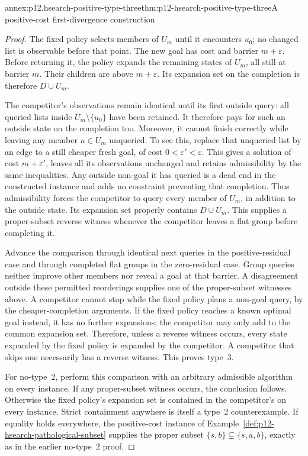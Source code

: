 \begin{annexitem}{annex:p12.hsearch-positive-type-three}{thm:p12-hsearch-positive-type-three}{A positive-cost first-divergence construction}
\begin{proof}
The fixed policy selects members of \(U_m\) until it encounters
\(u_0\); no changed list is observable before that point. The new
goal has cost and barrier \(m+\varepsilon\). Before returning it,
the policy expands the remaining states of \(U_m\), all still at
barrier \(m\). Their children are above \(m+\varepsilon\).
Its expansion set on the completion is therefore \(D\cup U_m\).

The competitor's observations remain identical until its first outside
query: all queried lists inside \(U_m\setminus\{u_0\}\) have
been retained.
It therefore pays for such an outside state on the completion too.
Moreover, it cannot finish correctly while leaving any member
\(u\in U_m\) unqueried. To see this, replace that unqueried list
by an edge to a still cheaper fresh goal, of cost
\(0<\varepsilon'<\varepsilon\). This gives a solution of cost
\(m+\varepsilon'\), leaves all its observations unchanged and
retains admissibility by the same inequalities. Any outside non-goal it
has queried is a dead end in the constructed instance and adds no
constraint preventing that completion. Thus admissibility forces the
competitor to query every member of \(U_m\), in addition to the
outside state. Its expansion set properly contains \(D\cup U_m\).
This supplies a proper-subset reverse witness whenever the competitor
leaves a flat group before completing it.

Advance the comparison through identical next queries in the
positive-residual case and through completed flat groups in the
zero-residual case. Group queries neither improve other members nor
reveal a goal at that barrier. A disagreement outside these permitted
reorderings supplies one of the proper-subset witnesses above. A
competitor cannot stop while the fixed policy plans a non-goal query,
by the cheaper-completion arguments. If the fixed policy reaches a
known optimal goal instead, it has no further expansions; the
competitor may only add to the common expansion set. Therefore, unless
a reverse witness occurs, every state expanded by the fixed policy is
expanded by the competitor. A competitor that skips one necessarily
has a reverse witness. This proves type~3.

For no-type~2, perform this comparison with an arbitrary admissible
algorithm on every instance. If any proper-subset witness occurs, the
conclusion follows. Otherwise the fixed policy's expansion set is
contained in the competitor's on every instance. Strict containment
anywhere is itself a type~2 counterexample. If equality holds everywhere,
the positive-cost instance of
Example~\ref{def:p12-hsearch-pathological-subset} supplies the proper
subset \(\{s,b\}\subsetneq\{s,a,b\}\), exactly as in the
earlier no-type~2 proof.


\end{proof}
\end{annexitem}
